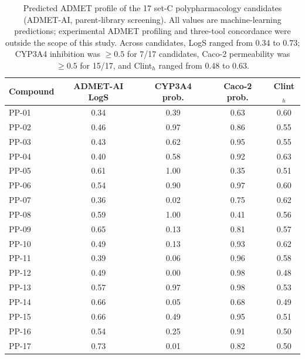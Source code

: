
\begin{table}[htbp]
\centering
\caption{Predicted ADMET profile of the \num{17} set-C polypharmacology candidates (ADMET-AI, parent-library screening). All values are machine-learning predictions; experimental ADMET profiling and three-tool concordance were outside the scope of this study. Across candidates, LogS ranged from \num{0.34} to \num{0.73}; CYP3A4 inhibition was $\geq\num{0.5}$ for \num{7}/\num{17} candidates, Caco-2 permeability was $\geq\num{0.5}$ for \num{15}/\num{17}, and Clint$_h$ ranged from \num{0.48} to \num{0.63}.}
\label{tab:s3_admet}
\begin{tabular}{l S[table-format=1.2] S[table-format=1.2] S[table-format=1.2] S[table-format=1.2]}
\toprule
Compound & {ADMET-AI LogS} & {CYP3A4 prob.} & {Caco-2 prob.} & {Clint$_h$} \\
\midrule
PP-01 & 0.34 & 0.39 & 0.63 & 0.60 \\
PP-02 & 0.46 & 0.97 & 0.86 & 0.55 \\
PP-03 & 0.43 & 0.62 & 0.95 & 0.55 \\
PP-04 & 0.40 & 0.58 & 0.92 & 0.63 \\
PP-05 & 0.61 & 1.00 & 0.35 & 0.51 \\
PP-06 & 0.54 & 0.90 & 0.97 & 0.60 \\
PP-07 & 0.36 & 0.02 & 0.75 & 0.62 \\
PP-08 & 0.59 & 1.00 & 0.41 & 0.56 \\
PP-09 & 0.65 & 0.13 & 0.81 & 0.57 \\
PP-10 & 0.49 & 0.13 & 0.93 & 0.62 \\
PP-11 & 0.39 & 0.06 & 0.96 & 0.58 \\
PP-12 & 0.49 & 0.00 & 0.98 & 0.48 \\
PP-13 & 0.57 & 0.97 & 0.98 & 0.53 \\
PP-14 & 0.66 & 0.05 & 0.68 & 0.49 \\
PP-15 & 0.66 & 0.49 & 0.95 & 0.51 \\
PP-16 & 0.54 & 0.25 & 0.91 & 0.50 \\
PP-17 & 0.73 & 0.01 & 0.82 & 0.50 \\
\bottomrule
\end{tabular}
\end{table}
